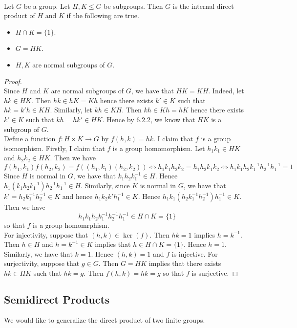 \documentclass[a4paper]{article}
\begin{document}
\begin{prp}{}{}\\
Let $G$ be a group. Let $H,K\leq G$ be subgroups. Then $G$ is the internal direct product of $H$ and $K$ if the following are true. 
\begin{itemize}
\item $H\cap K=\{1\}$. 
\item $G=HK$. 
\item $H,K$ are normal subgroups of $G$. 
\end{itemize}
\begin{proof}\\
Since $H$ and $K$ are normal subgroups of $G$, we have that $HK=KH$. Indeed, let $hk\in HK$. Then $hk\in hK=Kh$ hence there exists $k'\in K$ such that $hk=k'h\in KH$. Similarly, let $kh\in KH$. Then $kh\in Kh=hK$ hence there exists $k'\in K$ such that $kh=hk'\in HK$. Hence by 6.2.2, we know that $HK$ is a subgroup of $G$. \\

Define a function $f:H\times K\to G$ by $f(h,k)=hk$. I claim that $f$ is a group isomorphism. Firstly, I claim that $f$ is a group homomorphism. Let $h_1k_1\in HK$ and $h_2k_2\in HK$. Then we have $$f(h_1,k_1)f(h_2,k_2)=f((h_1,k_1)(h_2,k_2))\iff h_1k_1h_2k_2=h_1h_2k_1k_2\iff h_1k_1h_2k_1^{-1}h_2^{-1}h_1^{-1}=1$$ Since $H$ is normal in $G$, we have that $k_1h_2k_1^{-1}\in H$. Hence $h_1(k_1h_2k_1^{-1})h_2^{-1}h_1^{-1}\in H$. Similarly, since $K$ is normal in $G$, we have that $k'=h_2k_1^{-1}h_2^{-1}\in K$ and hence $h_1k_2k'h_1^{-1}\in K$. Hence $h_1k_1(h_2k_1^{-1}h_2^{-1})h_1^{-1}\in K$. Then we have $$h_1k_1h_2k_1^{-1}h_2^{-1}h_1^{-1}\in H\cap K=\{1\}$$ so that $f$ is a group homomrphism. \\

For injectivity, suppose that $(h,k)\in\ker(f)$. Then $hk=1$ implies $h=k^{-1}$.  Then $h\in H$ and $h=k^{-1}\in K$ implies that $h\in H\cap K=\{1\}$. Hence $h=1$. Similarly, we have that $k=1$. Hence $(h,k)=1$ and $f$ is injective. For surjectivity, suppose that $g\in G$. Then $G=HK$ implies that there exists $hk\in HK$ such that $hk=g$. Then $f(h,k)=hk=g$ so that $f$ is surjective. 
\end{proof}
\end{prp}

\subsection{Semidirect Products}
We would like to generalize the direct product of two finite groups. 
\end{document}
